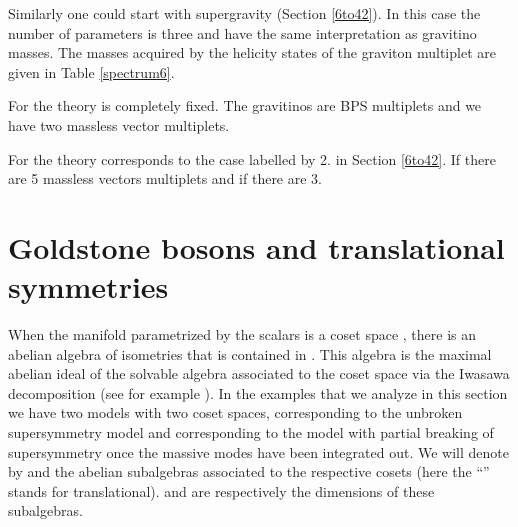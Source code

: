 \documentclass[a4paper,12pt]{article}
\begin{document}
\bigskip

Similarly one could start with \coordHE{} supergravity  (Section
\ref{6to42}). In this case the number of  parameters is three and
have the same interpretation as gravitino masses. The masses
acquired by the helicity states of the \coordHE{} graviton multiplet
are given in Table \ref{spectrum6}.




For \coordHE{} the theory is completely fixed. The gravitinos are
\coordHE{}BPS  multiplets and we have two massless vector
multiplets.

For \coordHE{} the theory corresponds to the case labelled by 2. in
Section \ref{6to42}.  If \coordHE{} there are 5 massless
vectors multiplets and if \coordHE{}  there are  3.


\section{Goldstone bosons and translational symmetries}

When the manifold parametrized by the scalars is a coset space
\coordHE{}, there is an abelian  algebra of isometries that is
contained in \coordHE{}. This algebra is the maximal abelian ideal of the
solvable algebra associated to the coset space via the Iwasawa
decomposition (see for example \cite{he}).  In the examples that
we analyze in this section we have two models with two coset
spaces, \coordHE{} corresponding to the unbroken supersymmetry model
and \coordHE{} corresponding to the model with partial breaking of
supersymmetry once  the massive modes have been integrated out.
We will denote by \coordHE{} and \coordHE{} the abelian
subalgebras associated to the respective cosets (here the
``\myHighlight{$\ft$}\coordHE{}'' stands for translational). \coordHE{} and \coordHE{} are respectively
the dimensions of these  subalgebras.
\end{document}
